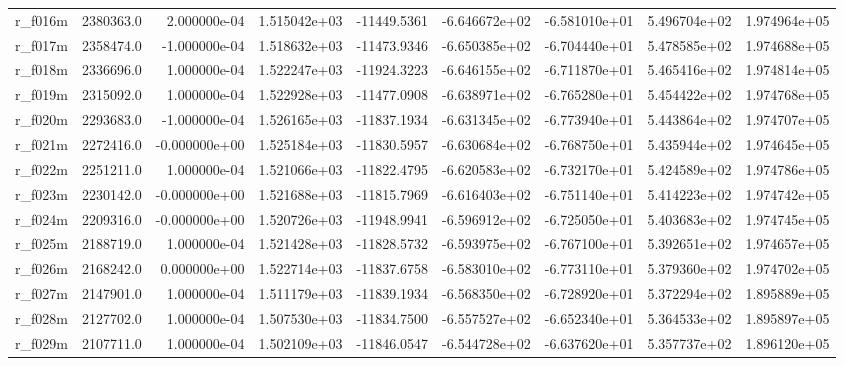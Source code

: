 \documentclass[12pt]{article}
\begin{document}
\begin{landscape}
\begin{longtable}{|l|r|r|r|r|r|r|r|r|}
r\_f016m                 &  2380363.0 &  2.000000e-04 &  1.515042e+03 & -11449.5361 & -6.646672e+02 & -6.581010e+01 &  5.496704e+02 &  1.974964e+05 \\
r\_f017m                 &  2358474.0 & -1.000000e-04 &  1.518632e+03 & -11473.9346 & -6.650385e+02 & -6.704440e+01 &  5.478585e+02 &  1.974688e+05 \\
r\_f018m                 &  2336696.0 &  1.000000e-04 &  1.522247e+03 & -11924.3223 & -6.646155e+02 & -6.711870e+01 &  5.465416e+02 &  1.974814e+05 \\
r\_f019m                 &  2315092.0 &  1.000000e-04 &  1.522928e+03 & -11477.0908 & -6.638971e+02 & -6.765280e+01 &  5.454422e+02 &  1.974768e+05 \\
r\_f020m                 &  2293683.0 & -1.000000e-04 &  1.526165e+03 & -11837.1934 & -6.631345e+02 & -6.773940e+01 &  5.443864e+02 &  1.974707e+05 \\
r\_f021m                 &  2272416.0 & -0.000000e+00 &  1.525184e+03 & -11830.5957 & -6.630684e+02 & -6.768750e+01 &  5.435944e+02 &  1.974645e+05 \\
r\_f022m                 &  2251211.0 &  1.000000e-04 &  1.521066e+03 & -11822.4795 & -6.620583e+02 & -6.732170e+01 &  5.424589e+02 &  1.974786e+05 \\
r\_f023m                 &  2230142.0 & -0.000000e+00 &  1.521688e+03 & -11815.7969 & -6.616403e+02 & -6.751140e+01 &  5.414223e+02 &  1.974742e+05 \\
r\_f024m                 &  2209316.0 & -0.000000e+00 &  1.520726e+03 & -11948.9941 & -6.596912e+02 & -6.725050e+01 &  5.403683e+02 &  1.974745e+05 \\
r\_f025m                 &  2188719.0 &  1.000000e-04 &  1.521428e+03 & -11828.5732 & -6.593975e+02 & -6.767100e+01 &  5.392651e+02 &  1.974657e+05 \\
r\_f026m                 &  2168242.0 &  0.000000e+00 &  1.522714e+03 & -11837.6758 & -6.583010e+02 & -6.773110e+01 &  5.379360e+02 &  1.974702e+05 \\
r\_f027m                 &  2147901.0 &  1.000000e-04 &  1.511179e+03 & -11839.1934 & -6.568350e+02 & -6.728920e+01 &  5.372294e+02 &  1.895889e+05 \\
r\_f028m                 &  2127702.0 &  1.000000e-04 &  1.507530e+03 & -11834.7500 & -6.557527e+02 & -6.652340e+01 &  5.364533e+02 &  1.895897e+05 \\
r\_f029m                 &  2107711.0 &  1.000000e-04 &  1.502109e+03 & -11846.0547 & -6.544728e+02 & -6.637620e+01 &  5.357737e+02 &  1.896120e+05 \\

\end{longtable}
\end{landscape}
\end{document}
